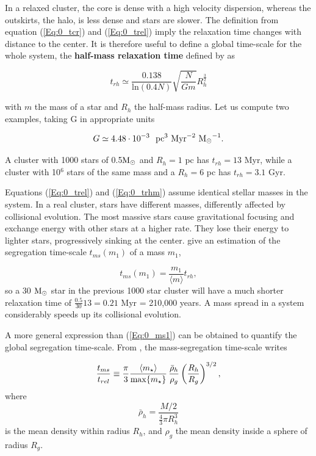 In a relaxed cluster, the core is dense with a high velocity dispersion, whereas the outskirts, the halo, is less dense and stars are slower. The definition from equation (\ref{Eq:0_tcr}) and (\ref{Eq:0_trel}) imply the relaxation time changes with distance to the center. It is therefore useful to define a global time-scale for the whole system, the \textbf{half-mass relaxation time} defined by \cite{Heggie2003} as


\begin{equation}
\label{Eq:0_trhm}
t_{rh} \simeq   \frac{0.138}{\textrm{ln}(0.4 N)} \sqrt{ \frac{N}{G m}} R_h^\frac{3}{2}
\end{equation}

with $m$ the mass of a star and $R_h$ the half-mass radius. Let us compute two examples, taking G in appropriate units

\begin{equation}
G \simeq 4.48 \cdot 10^{-3}~~ \textrm{pc}^3 ~\textrm{Myr}^{-2} ~{\textrm{M}_\odot}^{-1}.
\end{equation}

A cluster with 1000 stars of 0.5${\textrm{M}_\odot}$ and $R_{h} = 1$ pc has $t_{rh} = 13$ Myr, while a cluster with 10$^6$ stars of the same mass and a $R_{h} = 6$ pc has $t_{rh} = 3.1$ Gyr.


Equations (\ref{Eq:0_trel}) and (\ref{Eq:0_trhm}) assume identical stellar masses in the system. In a real cluster, stars have different masses, differently affected by collisional evolution. The most massive stars cause gravitational focusing and exchange energy with other stars at a higher rate. They lose their energy to lighter stars, progressively sinking at the center. \cite{Heggie2003} give an estimation of the segregation time-scale $t_{ms}(m_1)$ of a mass $m_1$,

\begin{equation}
\label{Eq:0_ms1}
t_{ms}(m_1) = \frac{m_1}{\langle m \rangle} t_{rh},
\end{equation} 
so a 30 ${\textrm{M}_\odot}$ star in the previous 1000 star cluster will have a much shorter relaxation time of $\frac{0.5}{30} 13 = 0.21$ Myr = 210,000 years. A mass spread in a system considerably speeds up its collisional evolution.

A more general expression than (\ref{Eq:0_ms1}) can be obtained to quantify the global segregation time-scale. From \cite{Fleck2006}, the mass-segregation time-scale writes

\begin{equation}
\label{Eq:0_ms2} 
  \frac{t_{ms}}{t_{rel}} \equiv \frac{\pi}{3} \frac{\langle m_\star\rangle}{\max\{m_\star\}} \, \frac{\bar{\rho}_h}{\rho_g} \left( \frac{R_h}{R_g}\right)^{3/2} ,
\end{equation}
where
\begin{equation}
\bar{\rho}_h = \frac{M/2}{ \frac{4}{3}\pi R_h^3}
\end{equation} 
is the mean density within radius $R_h$, and $\rho_g$ the mean density inside a sphere of radius $R_g$.



